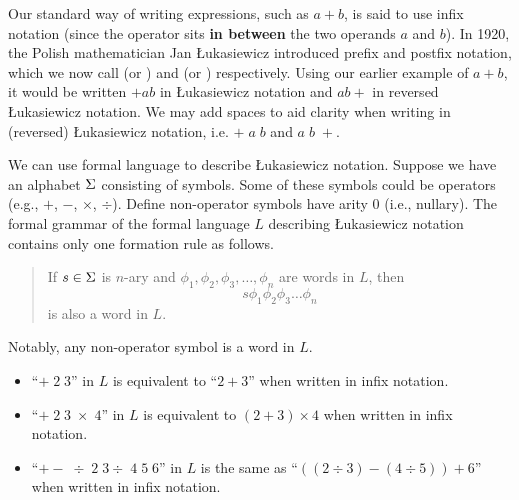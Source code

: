 \begin{example}
    \setlength{\parindent}{1.5em}
    Our standard way of writing expressions, such as $a+b$, is said to use infix notation (since the operator sits \textbf{in between} the two operands $a$ and $b$). In 1920, the Polish mathematician Jan
    {\L}ukasiewicz introduced prefix and postfix notation, which we now call  (or ) and  (or ) respectively. Using our earlier example of $a+b$, it would be written $+ab$ in {\L}ukasiewicz notation and $ab+$ in reversed {\L}ukasiewicz notation. We may add spaces to aid clarity when writing in (reversed) {\L}ukasiewicz notation, i.e. $+\;a\;b$ and $a\;b\;+$.

    We can use formal language to describe {\L}ukasiewicz notation. Suppose we have an alphabet $\Sigma$ consisting of symbols. Some of these symbols could be operators (e.g., $+$, $-$, $\times$, $\div$). Define non-operator symbols have arity 0 (i.e., nullary). The formal grammar of the formal language $L$ describing {\L}ukasiewicz notation contains only one formation rule as follows.
    \begin{quote}
        If $s \in \Sigma$ is $n$-ary and $\phi_1, \phi_2, \phi_3, \dots, \phi_n$ are words in $L$, then
        \[
            s\phi_1\phi_2\phi_3\dots\phi_n
        \]
        is also a word in $L$.
    \end{quote}
    Notably, any non-operator symbol is a word in $L$.
    \begin{itemize}
        \item ``$+\;2\;3$'' in $L$ is equivalent to ``$2+3$'' when written in infix notation.
        \item ``$+\;2\;3\;\times\;4$'' in $L$ is equivalent to $(2 + 3) \times 4$ when written in infix notation.
        \item ``$+-\;\div\;2\;3\div\;4\;5\;6$'' in $L$ is the same as ``$((2 \div 3) - (4 \div 5)) + 6$'' when written in infix notation.
    \end{itemize}
\end{example}

